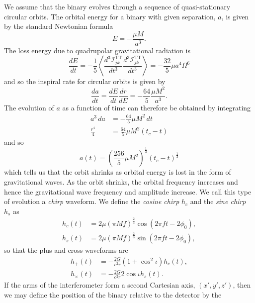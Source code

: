 We assume that the binary evolves through a sequence of quasi-stationary
circular orbits. The orbital energy for a binary with given separation, $a$,
is given by the standard Newtonian formula
\begin{equation}
E = -\frac{\mu M}{a^3}.
\end{equation}
The loss energy due to quadrupolar gravitational radiation is\cite{MTW73}
\begin{equation}
\frac{dE}{dt} = - \frac{1}{5} \left\langle 
\frac{d^3 \mathcal{I}^\mathrm{TT}_{jk}}{dt^3}
\frac{d^3 \mathcal{I}^\mathrm{TT}_{jk}}{dt^3}
\right\rangle = - \frac{32}{5}\mu a^4 \Omega^6
\end{equation}
and so the inspiral rate for circular orbits is given by
\begin{equation}
\frac{da}{dt} = \frac{dE}{dt}\frac{dr}{dE} = - \frac{64}{5}\frac{\mu
M^2}{a^3}.
\end{equation}
The evolution of $a$ as a function of time can therefore be obtained by
integrating
\begin{align}
a^3 \, da &= - \frac{64}{5} \mu M^2 \, dt \\
\frac{r^4}{4} &= \frac{64}{5} \mu M^2 (t_c - t)
\end{align}
and so
\begin{equation}
a(t) = \left(\frac{256}{5} \mu M^2 \right)^{\frac{1}{4}}
       \left(t_c - t\right)^{\frac{1}{4}}
\label{eq:aoft}
\end{equation}
which tells us that the orbit shrinks as orbital energy is lost in the form of
gravitational waves. As the orbit shrinks, the orbital frequency increases and
hence the gravitational wave frequency and amplitude increase. We call this
type of evolution a \emph{chirp} waveform. We define the \emph{cosine chirp}
$h_c$  and the \emph{sine chirp} $h_s$ as 
\begin{align}
\label{eq:coschirp}
h_c(t) & = 2\mu (\pi M f)^{\frac{2}{3}} \cos(2\pi f t - 2\phi_0), \\
h_s(t) & = 2\mu (\pi M f)^{\frac{2}{3}} \sin(2\pi f t - 2\phi_0),
\label{eq:sinechirp}
\end{align}
so that the plus and cross waveforms are
\begin{align}
\label{eq:hpluswave}
h_+(t) &= - \frac{2G}{c^2 r} (1 + \cos^2\iota) h_c(t), \\
h_\times(t) &= - \frac{2G}{c^2 r} 2\cos\iota h_s(t).
\end{align}
If the arms of the interferometer form a second Cartesian axis, $(x',y',z')$,
then we may define the position of the binary relative to the detector by the
